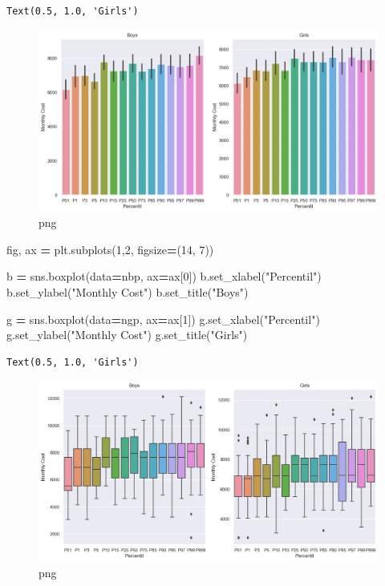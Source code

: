 \documentclass[
]{article}
\newenvironment{Shaded}{\begin{snugshade}}{\end{snugshade}}
\newcommand{\DecValTok}[1]{\textcolor[rgb]{0.00,0.00,0.81}{#1}}
\newcommand{\NormalTok}[1]{#1}
\newcommand{\OperatorTok}[1]{\textcolor[rgb]{0.81,0.36,0.00}{\textbf{#1}}}
\newcommand{\StringTok}[1]{\textcolor[rgb]{0.31,0.60,0.02}{#1}}
\begin{document}
\begin{verbatim}
Text(0.5, 1.0, 'Girls')
\end{verbatim}

\begin{figure}
\centering
\includegraphics{output_31_1.png}
\caption{png}
\end{figure}

\begin{Shaded}
\begin{Highlighting}[]
\NormalTok{fig, ax }\OperatorTok{=}\NormalTok{ plt.subplots(}\DecValTok{1}\NormalTok{,}\DecValTok{2}\NormalTok{, figsize}\OperatorTok{=}\NormalTok{(}\DecValTok{14}\NormalTok{, }\DecValTok{7}\NormalTok{))}

\NormalTok{b }\OperatorTok{=}\NormalTok{ sns.boxplot(data}\OperatorTok{=}\NormalTok{nbp, ax}\OperatorTok{=}\NormalTok{ax[}\DecValTok{0}\NormalTok{])}
\NormalTok{b.set\_xlabel(}\StringTok{"Percentil"}\NormalTok{)}
\NormalTok{b.set\_ylabel(}\StringTok{"Monthly Cost"}\NormalTok{)}
\NormalTok{b.set\_title(}\StringTok{"Boys"}\NormalTok{)}

\NormalTok{g }\OperatorTok{=}\NormalTok{ sns.boxplot(data}\OperatorTok{=}\NormalTok{ngp, ax}\OperatorTok{=}\NormalTok{ax[}\DecValTok{1}\NormalTok{])}
\NormalTok{g.set\_xlabel(}\StringTok{"Percentil"}\NormalTok{)}
\NormalTok{g.set\_ylabel(}\StringTok{"Monthly Cost"}\NormalTok{)}
\NormalTok{g.set\_title(}\StringTok{"Girls"}\NormalTok{)}
\end{Highlighting}
\end{Shaded}

\begin{verbatim}
Text(0.5, 1.0, 'Girls')
\end{verbatim}

\begin{figure}
\centering
\includegraphics{output_32_1.png}
\caption{png}
\end{figure}
\end{document}
